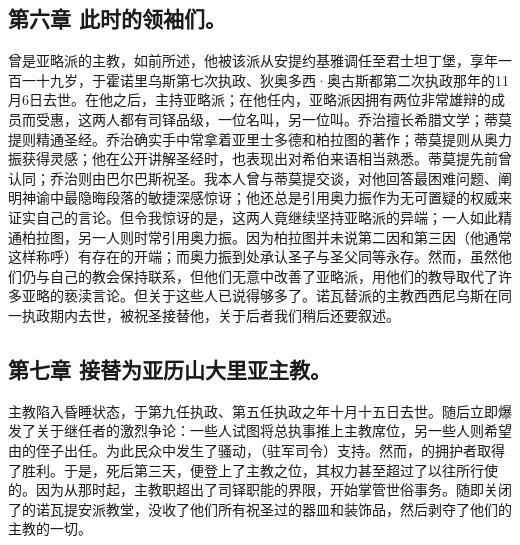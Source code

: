 
\subsection{第六章 此时的领袖们。}

曾是亚略派的主教，如前所述，他被该派从安提约基雅调任至君士坦丁堡，享年一百一十九岁，于霍诺里乌斯第七次执政、狄奥多西·奥古斯都第二次执政那年的11月6日去世。在他之后，主持亚略派；在他任内，亚略派因拥有两位非常雄辩的成员而受惠，这两人都有司铎品级，一位名叫，另一位叫。乔治擅长希腊文学；蒂莫提则精通圣经。乔治确实手中常拿着亚里士多德和柏拉图的著作；蒂莫提则从奥力振获得灵感；他在公开讲解圣经时，也表现出对希伯来语相当熟悉。蒂莫提先前曾认同；乔治则由巴尔巴斯祝圣。我本人曾与蒂莫提交谈，对他回答最困难问题、阐明神谕中最隐晦段落的敏捷深感惊讶；他还总是引用奥力振作为无可置疑的权威来证实自己的言论。但令我惊讶的是，这两人竟继续坚持亚略派的异端；一人如此精通柏拉图，另一人则时常引用奥力振。因为柏拉图并未说第二因和第三因（他通常这样称呼）有存在的开端；而奥力振到处承认圣子与圣父同等永存。然而，虽然他们仍与自己的教会保持联系，但他们无意中改善了亚略派，用他们的教导取代了许多亚略的亵渎言论。但关于这些人已说得够多了。诺瓦替派的主教西西尼乌斯在同一执政期内去世，被祝圣接替他，关于后者我们稍后还要叙述。\par


\subsection{第七章 接替为亚历山大里亚主教。}

主教陷入昏睡状态，于第九任执政、第五任执政之年十月十五日去世。随后立即爆发了关于继任者的激烈争论：一些人试图将总执事推上主教席位，另一些人则希望由的侄子出任。为此民众中发生了骚动，（驻军司令）支持。然而，的拥护者取得了胜利。于是，死后第三天，便登上了主教之位，其权力甚至超过了以往所行使的。因为从那时起，主教职超出了司铎职能的界限，开始掌管世俗事务。随即关闭了的诺瓦提安派教堂，没收了他们所有祝圣过的器皿和装饰品，然后剥夺了他们的主教的一切。\par

